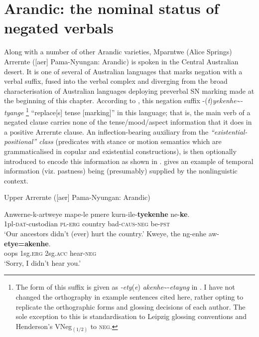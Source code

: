 \documentclass[output=paper,draft,draftmode,colorlinks,citecolor=brown]{langscibook}
\begin{document}
\section{Arandic: the nominal status of negated verbals}\label{sec:austr-5}
\largerpage[-1]
Along with a number of other Arandic varieties, Mparntwe (Alice Springs)
Arrernte ([aer] Pama-Nyungan: Arandic) is spoken in the
Central Australian desert. It is one of several of Australian languages
that marks negation with a verbal suffix, fused into the verbal complex and
diverging from the broad characterisation of Australian languages deploying
preverbal SN marking made at the beginning of this chapter. According to
\citet[71]{Wilkins1989}, this negation suffix
-(\textit{t})\textit{yekenhe\textasciitilde-tyange}%
%
\footnote{The form of this suffix is given as
\textit{-ety}(\textit{e})\textdblhyphen
\textit{akenhe}\textasciitilde-\textit{etayng} in \citealt{Henderson2013}. I have not changed the orthography in example sentences cited here, rather opting to replicate the orthographic forms and glossing decisions of each author. The sole exception to this is standardisation to Leipzig glossing conventions and Henderson's VNeg$_{(1/2)} $ to \textsc{neg}.} 
%
``replace[s] tense [marking]'' in this language; that is, the main verb of
a negated clause carries none of the tense\slash mood\slash aspect
information that it does in a positive Arrernte clause. An
inflection-bearing auxiliary from the \textit{``existential-positional''
class} (predicates with stance or motion semantics which are
grammaticalised in copular and existential constructions), is then
optionally introduced to encode this information as shown in
.  gives an example of temporal information (viz. pastness) being (presumably) supplied by the nonlinguistic context.
%
\begin{exe}\ex\label{ex:austr-arrernte-ancestors-hear} 
    Upper Arrernte ([aer] Pama-Nyungan: Arandic)
    \begin{xlist}
        \ex\label{ex:austr-arrernte-ancestors} 
        \gll Anwerne-k-artweye mape-le pmere kurn-ile-\textbf{tyekenhe} ne-\textbf{ke}.\\
1pl\textsc{-dat-}custodian \textsc{pl-erg} country bad\textsc{-caus-neg} be-\textsc{pst}\\
\glt `Our ancestors didn't (ever) hurt the country.'\citep[235]{Wilkins1989}
%
    \ex\label{ex:austr-arrernte-hear}
    \gll Kweye, the ng-enhe aw-\textbf{etye=akenhe}.\\
oops 1sg.\textsc{erg} 2sg.\textsc{acc} hear-\textsc{neg}\\
\glt `Sorry, I didn't hear you.'\citep[412]{Henderson2013}
    \end{xlist}\end{exe}
\end{document}
